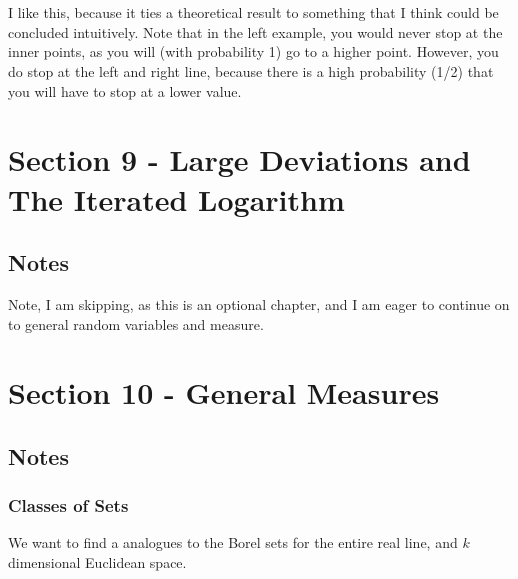\documentclass[12pt,a4paper]{article}
\newcommand{\1}[1]{\mathbbm{1}\left\{ #1 \right\}}
\begin{document}
\\\\
I like this, because it ties a theoretical result to something that I think could be concluded intuitively. Note that in the left example, you would never stop at the inner points, as you will (with probability 1) go to a higher point. However, you do stop at the left and right line, because there is a high probability (1/2) that you will have to stop at a lower value.


\section{Section 9 - Large Deviations and The Iterated Logarithm}
\subsection{Notes} Note, I am skipping, as this is an optional chapter, and I am eager to continue on to general random variables and measure.


\section{Section 10 - General Measures}
\subsection{Notes}
\subsubsection{Classes of Sets} We want to find a analogues to the Borel sets for the entire real line, and $k$ dimensional Euclidean space. 
\end{document}

